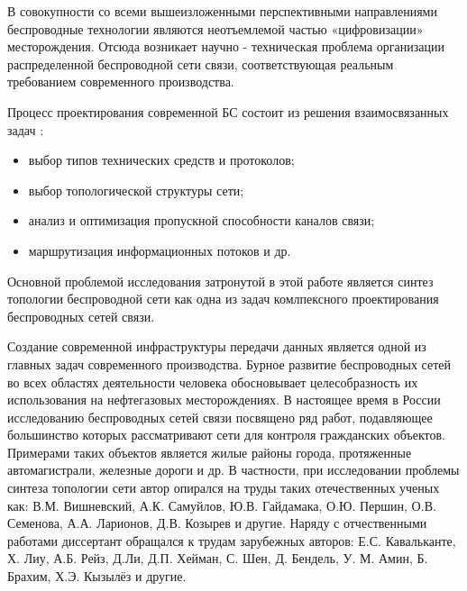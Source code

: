 В совокупности со всеми вышеизложенными перспективными направлениями беспроводные технологии являются неотъемлемой частью «цифровизации» месторождения. Отсюда возникает научно - техническая проблема организации распределенной беспроводной сети связи, соответствующая реальным требованием современного производства.




Процесс проектирования современной БС состоит из решения взаимосвязанных задач \cite{VishnevskyBook}:

\begin{itemize}
    \item выбор типов технических средств и протоколов;
    \item выбор топологической структуры сети;
    \item анализ и оптимизация пропускной способности каналов связи;
    \item маршрутизация информационных потоков и др.
\end{itemize}

Основной проблемой исследования затронутой в этой работе является синтез топологии беспроводной сети как одна из задач комлпексного проектирования беспроводных сетей связи.


{\progress} Создание современной инфраструктуры передачи данных является одной из главных задач современного производства. Бурное развитие беспроводных сетей во всех областях деятельности человека обосновывает целесобразность их использования на нефтегазовых месторождениях. В настоящее время в России исследованию беспроводных сетей связи посвящено ряд работ, подавляющее большинство которых рассматривают сети для контроля гражданских объектов. Примерами таких объектов является жилые районы города, протяженные автомагистрали, железные дороги и др. В частности, при исследовании проблемы синтеза топологии сети автор опирался на труды таких отечественных ученых как: В.М. Вишневский, А.К. Самуйлов, Ю.В. Гайдамака, О.Ю. Першин, О.В. Семенова, А.А. Ларионов, Д.В. Козырев и другие.
Наряду с отчественными работами диссертант обращался к трудам зарубежных авторов: Е.С. Кавальканте, Х. Лиу, А.Б. Рейз, Д.Ли, Д.П. Хейман, С. Шен, Д. Бендель, У. М. Амин, Б. Брахим, Х.Э. Кызылёз и другие. 

